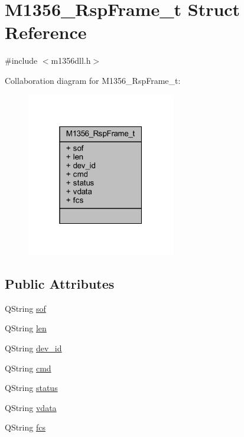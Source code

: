 \hypertarget{struct_m1356___rsp_frame__t}{}\section{M1356\+\_\+\+Rsp\+Frame\+\_\+t Struct Reference}
\label{struct_m1356___rsp_frame__t}


{\ttfamily \#include $<$m1356dll.\+h$>$}



Collaboration diagram for M1356\+\_\+\+Rsp\+Frame\+\_\+t\+:\nopagebreak
\begin{figure}[H]
\begin{center}
\leavevmode
\includegraphics[width=184pt]{struct_m1356___rsp_frame__t__coll__graph}
\end{center}
\end{figure}
\subsection*{Public Attributes}
\begin{DoxyCompactItemize}
\item 
Q\+String \mbox{\hyperlink{struct_m1356___rsp_frame__t_a34b619185b2394e730be0adb09089b13}{sof}}
\item 
Q\+String \mbox{\hyperlink{struct_m1356___rsp_frame__t_a26a38928649bcc1e1a0cbd1319bc2bf6}{len}}
\item 
Q\+String \mbox{\hyperlink{struct_m1356___rsp_frame__t_acf0e4adc6b24f077be6b04982f4c88aa}{dev\+\_\+id}}
\item 
Q\+String \mbox{\hyperlink{struct_m1356___rsp_frame__t_a036ac74dd39f0b6e9febe69f9f410352}{cmd}}
\item 
Q\+String \mbox{\hyperlink{struct_m1356___rsp_frame__t_a8a97971b3dadcb42f1f9ca0c7a0148de}{status}}
\item 
Q\+String \mbox{\hyperlink{struct_m1356___rsp_frame__t_aebced86ccafc1bd99e72bce2dcc0d6c4}{vdata}}
\item 
Q\+String \mbox{\hyperlink{struct_m1356___rsp_frame__t_a1089657677dca8b2b6daea7403724760}{fcs}}
\end{DoxyCompactItemize}


